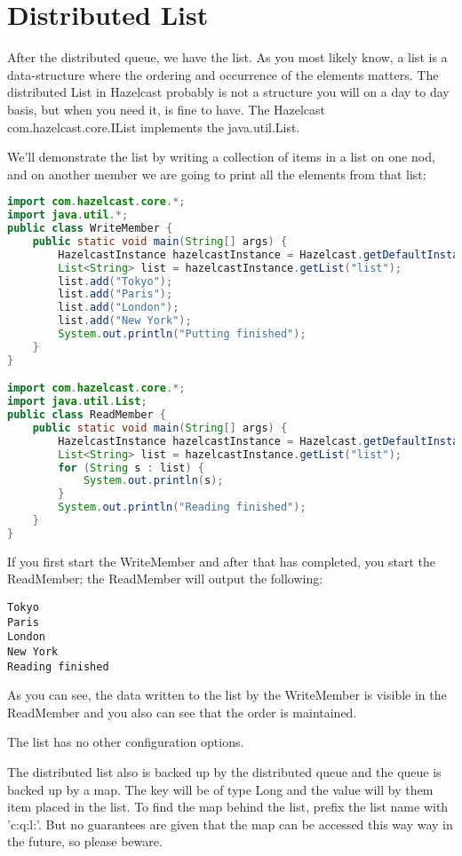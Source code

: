 \section{Distributed List}

After the distributed queue, we have the list. As you most likely know, a list is a data-structure where the ordering and occurrence of the elements matters. The distributed List in Hazelcast probably is not a structure you will on a day to day basis, but when you need it, is fine to have. The Hazelcast com.hazelcast.core.IList implements the java.util.List.

We'll demonstrate the list by writing a collection of items in a list on one nod, and on another member we are going to print all the elements from that list:

\begin{lstlisting}[language=java]
import com.hazelcast.core.*;
import java.util.*;
public class WriteMember {
    public static void main(String[] args) {
        HazelcastInstance hazelcastInstance = Hazelcast.getDefaultInstance();
        List<String> list = hazelcastInstance.getList("list");
        list.add("Tokyo");
        list.add("Paris");
        list.add("London");
        list.add("New York");
        System.out.println("Putting finished");
    }
}

import com.hazelcast.core.*;
import java.util.List;
public class ReadMember {
    public static void main(String[] args) {
        HazelcastInstance hazelcastInstance = Hazelcast.getDefaultInstance();
        List<String> list = hazelcastInstance.getList("list");
        for (String s : list) {
            System.out.println(s);
        }
        System.out.println("Reading finished");
    }
}
\end{lstlisting}

If you first start the WriteMember and after that has completed, you start the ReadMember; the ReadMember will output the following:
\begin{verbatim}
Tokyo
Paris
London
New York
Reading finished
\end{verbatim}
As you can see, the data written to the list by the WriteMember is visible in the ReadMember and you also can see that the order is maintained.

The list has no other configuration options.

The distributed list also is backed up by the distributed queue and the queue is backed up by a map. The key will be of type Long and the value will by them item placed in the list. To find the map behind the list, prefix the list name with 'c:q:l:'. But no guarantees are given that the map can be accessed this way way in the future, so please beware. 

